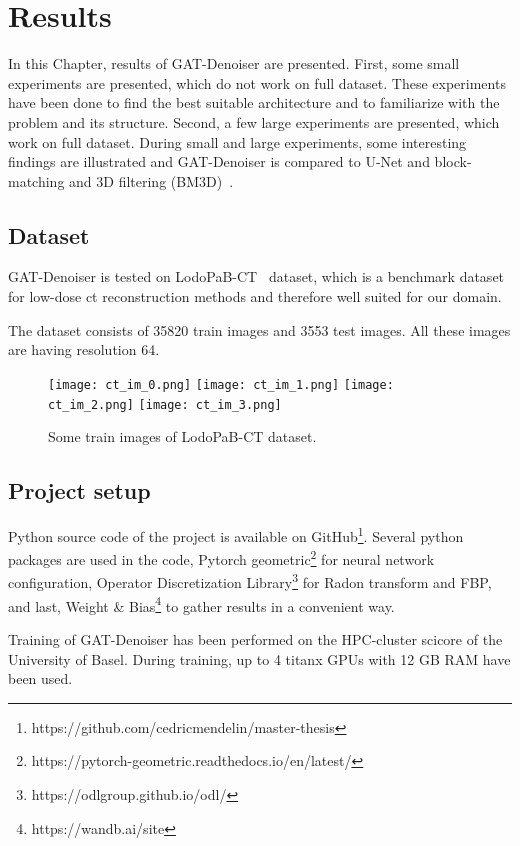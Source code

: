 \chapter{Results}
\label{sec:results}

In this Chapter, results of GAT-Denoiser are presented.
First, some small experiments are presented, which do not work on full dataset.
These experiments have been done to find the best suitable architecture and to 
familiarize with the problem and its structure.
Second, a few large experiments are presented, which work on full dataset.
During small and large experiments, some interesting findings are illustrated and GAT-Denoiser
is compared to U-Net and block-matching and 3D filtering (BM3D)~\cite{bm3d}.


\section{Dataset}
GAT-Denoiser is tested on LodoPaB-CT~\cite{lodopab-dataset} dataset, which is a 
benchmark dataset for low-dose ct reconstruction methods and therefore well suited for our domain.

The dataset consists of 35820 train images and 3553 test images.
All these images are having resolution 64.

\begin{figure}[H]
  \centering
  \hfill
  \texttt{[image: ct\_im\_0.png]}
  \hfill
  \texttt{[image: ct\_im\_1.png]}
  \hfill
  \texttt{[image: ct\_im\_2.png]}
  \hfill
  \texttt{[image: ct\_im\_3.png]}
  \hfill
  \caption{Some train images of LodoPaB-CT dataset.}
\end{figure}



\section{Project setup}
Python source code of the project is available on GitHub\footnote{https://github.com/cedricmendelin/master-thesis}.
Several python packages are used in the code, Pytorch geometric\footnote{https://pytorch-geometric.readthedocs.io/en/latest/} 
for neural network configuration, Operator Discretization Library\footnote{https://odlgroup.github.io/odl/} for Radon transform and FBP, 
and last, Weight \& Bias\footnote{https://wandb.ai/site} to gather results in a convenient way.

Training of GAT-Denoiser has been performed on the HPC-cluster scicore of the University of Basel.
During training, up to 4 titanx GPUs with 12 GB RAM have been used.


